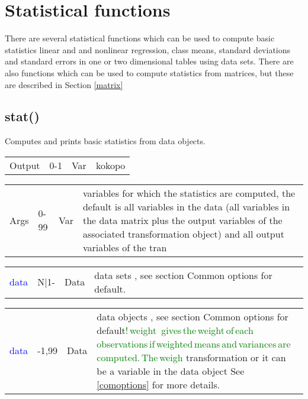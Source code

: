 \section{Statistical functions}
\label{statistics}
 There are several statistical functions which can be used to compute basic statistics
linear and and nonlinear regression, class means, standard deviations and standard errors
 in one or two dimensional tables using data sets. There are also functions
 which can be used to compute statistics from matrices, but these are described
 in Section  \ref{matrix}
\subsection{stat()}
\label{stat}
 Computes and prints basic statistics from data objects.
\begin{table}[H]
\begin{tabular}{ m{}  m{}m{}p{}}
Output&0-1&Var& kokopo
\\ \cline{1-4}
\end{tabular}
\end{table}
\vspace{-1.51em}
\begin{table}[H]
\begin{tabular}{ m{}  m{}m{}p{}}
 Args & 0-99&Var&variables for which the statistics are computed,
 the default is all variables in the data (all variables in the data matrix plus the output variables of the associated transformation object) and all output variables of the tran

\\ \cline{1-4}
\end{tabular}
\end{table}
\vspace{-1.51em}
\begin{table}[H]
\begin{tabular}{ m{}  m{}m{}p{}}
\textcolor{blue}{data} & N|1- & Data &	data sets , see section Common options for default.
\\ \cline{1-4}
\end{tabular}
\end{table}
\vspace{-1.51em}
\begin{table}[H]
\begin{tabular}{ m{}  m{}m{}p{}}
 \textcolor{blue}{data} & -1,99 & Data &	data objects , see section Common options for default\textcolor{green}{!\,weight\,	gives\,the\,weight\,of\,each\,observations\,if\,weighted\,means\,and\,variances\,are\,computed.\,The\,weigh}
 transformation or it can be a variable in the data object
See \vref{comoptions} for more details.
\\ \cline{1-4}
\end{tabular}
\end{table}
